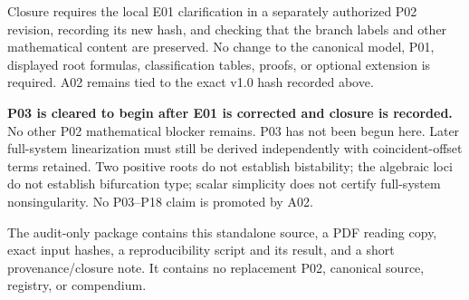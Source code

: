\documentclass[11pt]{article}
\begin{document}
Closure requires the local E01 clarification in a separately authorized
P02 revision, recording its new hash, and checking that the branch
labels and other mathematical content are preserved. No change to
the canonical model, P01, displayed root formulas, classification
tables, proofs, or optional extension is required. A02 remains
tied to the exact v1.0 hash recorded above.

\textbf{P03 is cleared to begin after E01 is corrected and closure is
recorded.} No other P02 mathematical blocker remains.
P03 has not been begun here. Later full-system linearization must
still be derived independently with coincident-offset terms retained.
Two positive roots do not establish bistability; the algebraic loci
do not establish bifurcation type; scalar simplicity does not certify
full-system nonsingularity. No P03--P18 claim is promoted by A02.

The audit-only package contains this standalone source, a PDF reading
copy, exact input hashes, a reproducibility script and its result,
and a short provenance/closure note. It contains no replacement
P02, canonical source, registry, or compendium.
\end{document}
